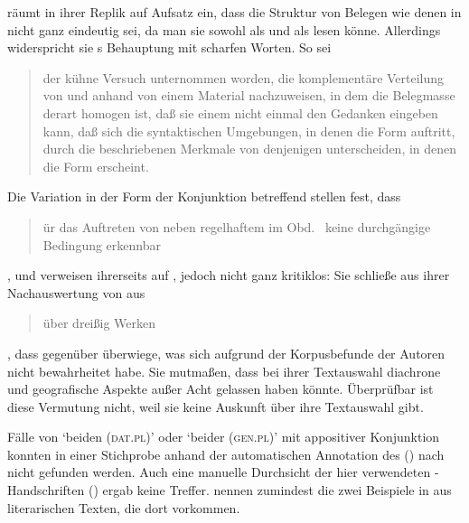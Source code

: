 \citet[187]{gjelsten1980} räumt in ihrer Replik auf 
Aufsatz ein, dass die Struktur von Belegen wie denen in 
nicht ganz eindeutig sei, da man sie sowohl als  und als  lesen
könne. Allerdings widerspricht sie \citeauthor{askedal1974}s Behauptung mit
scharfen Worten. So sei \blockcquote[196]{gjelsten1980}{der kühne Versuch
unternommen worden, die komplementäre Verteilung
von  und  anhand von einem Material nachzuweisen, in dem
die Belegmasse derart homogen ist, daß sie einem nicht einmal den Gedanken
eingeben kann, daß sich die syntaktischen Umgebungen, in denen die Form
 auftritt, durch die beschriebenen Merkmale von denjenigen
unterscheiden, in denen die Form  erscheint.}

Die Variation in der Form der Konjunktion betreffend stellen \citet[628]{ksw2}
fest, dass \blockquote{ür das Auftreten von  neben
regelhaftem  im Obd.\ \textelp{} keine durchgängige
Bedingung erkennbar }, und
verweisen ihrerseits auf \citet{gjelsten1980}, jedoch nicht ganz kritiklos: Sie
schließe aus ihrer Nachauswertung von  aus
\blockcquote[198]{gjelsten1980}{über dreißig Werken}, dass 
gegenüber  überwiege, was sich aufgrund der Korpusbefunde der
Autoren nicht bewahrheitet habe. Sie mutmaßen, dass \citeauthor{gjelsten1980}
bei ihrer Textauswahl diachrone und
geografische Aspekte außer Acht gelassen haben könnte.
Überprüfbar ist diese Vermutung nicht, weil sie keine Auskunft über ihre
Textauswahl gibt.

Fälle von  `beiden (\textsc{dat.pl})' oder  `beider
(\textsc{gen.pl})' mit appositiver Konjunktion konnten in einer
Stichprobe anhand der automatischen Annotation des  (\CAO) nach \citet{schmid2019} nicht
gefunden werden. Auch eine manuelle Durchsicht der hier verwendeten
-Handschriften (\KC) ergab keine Treffer. \citet[626]{ksw2}
nennen zumindest die zwei Beispiele in  aus literarischen
Texten, die dort  vorkommen.

